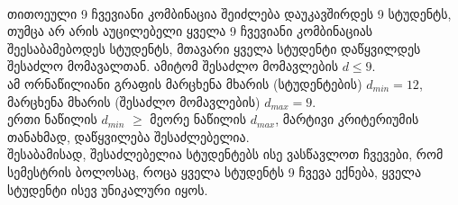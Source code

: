 \documentclass[a4paper, 11pt]{article}
\begin{document}
\begin{sloppypar}
\\  თითოეული 9 ჩვევიანი კომბინაცია შეიძლება დაუკავშირდეს 9 სტუდენტს, თუმცა არ არის აუცილებელი ყველა 9 ჩვევიანი კომბინაციას შეესაბამებოდეს სტუდენტს, მთავარი ყველა სტუდენტი დაწყვილდეს შესაძლო მომავალთან. ამიტომ შესაძლო მომავლების $d \leq 9$.
\\ ამ ორნაწილიანი გრაფის მარცხენა მხარის (სტუდენტების) $d_{min} = 12$, მარცხენა მხარის (შესაძლო მომავლების) $d_{max} = 9$.
\\ ერთი ნაწილის $d_{min}$ $\geq$ მეორე ნაწილის $d_{max}$, მარტივი კრიტერიუმის თანახმად, დაწყვილება შესაძლებელია.
\\ შესაბამისად, შესაძლებელია სტუდენტებს ისე ვასწავლოთ ჩვევები, რომ სემესტრის ბოლოსაც, როცა ყველა სტუდენტს 9 ჩვევა ექნება, ყველა სტუდენტი ისევ უნიკალური იყოს.

\end{sloppypar}
\end{document}
